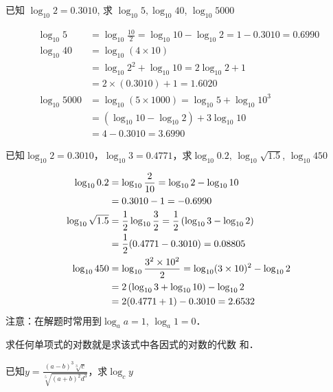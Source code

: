 \begin{example}
已知 $\log _{10} 2=0.3010$, 求 $\log_{10} 5, \log_{10} 40$,
    $\log_{10} 5000$
\end{example}

\begin{solution}
\[\begin{split}
  \log _{10} 5&=\log _{10} \frac{10}{2}=\log _{10} 10-\log _{10} 2=1-0.3010=0.6990 \\
   \log _{10} 40&=\log_{10}(4 \times 10)\\
   &=\log_{10} 2^{2}+\log_{10} 10=2 \log_{10} 2+1\\
    &=2 \times(0.3010)+1=1.6020\\
    \log _{10} 5000&=\log _{10}(5 \times 1000)=\log _{10} 5+\log _{10} 10^{3}\\
    &=\left(\log_{10} 10-\log_{10} 2\right)+3 \log _{10} 10\\
    &=4-0.3010=3.6990
\end{split}\]
\end{solution}


\begin{example}
已知$\log_{10}2=0.3010$，$\log_{10}3=0.4771$，求$\log _{10} 0.2$, $\log _{10} \sqrt{1.5}$, $\log _{10} 450$
\end{example}    

\begin{solution}
    \[\begin{split}
        \log _{10} 0.2 &=\log _{10} \dfrac{2}{10}=\log _{10} 2-\log _{10} 10\\ 
        &=0.3010-1 =-0.6990\\
        \log _{10} \sqrt{1.5} &=\dfrac{1}{2} \log _{10} \dfrac{3}{2}=\dfrac{1}{2}\left(\log _{10} 3-\log _{10} 2\right)\\
        &=\dfrac{1}{2}(0.4771-0.3010)=0.08805\\
        \log _{10} 450 &=\log_{10}\dfrac{3^2\times 10^2}{2}=\log_{10}(3\times 10)^2-\log_{10} 2\\
        &=2\left(\log_{10}3+\log_{10}10\right) -\log_{10}2\\
        &=2(0.4771+1)-0.3010=2.6532
\end{split}\]
注意：在解题时常用到$\log_a a=1$, $\log_a 1=0$．
\end{solution}    

求任何单项式的对数就是求该式中各因式的对数的代数
和．
    
\begin{example}
    已知$y=\frac{(a-b)^3\sqrt[3]{c}}{\sqrt[5]{(a+b)^2d^3}}$，求$\log_c y$
\end{example}

